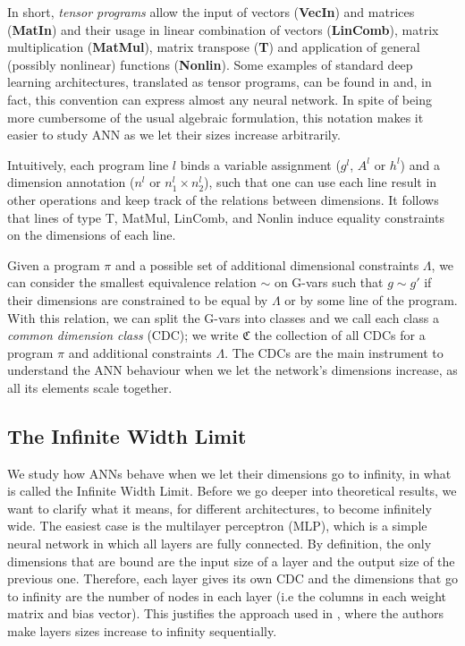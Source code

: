 \documentclass[11pt,notitlepage]{article}
\numberwithin{equation}{section}
\theoremstyle{remark}
\theoremstyle{definition}
\begin{document}
	In short, \emph{tensor programs} allow the input of vectors (\textbf{VecIn}) and matrices (\textbf{MatIn}) and their usage in linear combination of vectors (\textbf{LinComb}), matrix multiplication (\textbf{MatMul}), matrix transpose (\textbf{T}) and application of general (possibly nonlinear) functions (\textbf{Nonlin}).
	Some examples of standard deep learning architectures, translated as tensor programs, can be found in \cite[Section 3]{yang2019scaling} and, in fact, this convention can express almost any neural network.
	In spite of being more cumbersome of the usual algebraic formulation, this notation makes it easier to study ANN as we let their sizes increase arbitrarily.
	
	Intuitively, each program line $l$ binds a variable assignment ($g^l$, $A^l$ or $h^l$) and a dimension annotation ($n^l$ or $n^l_1 \times n^l_2$), such that one can use each line result in other operations and keep track of the relations between dimensions.
	It follows that lines of type T, MatMul, LinComb, and Nonlin induce equality constraints on the dimensions of each line.
	
	Given a program $\pi$ and a possible set of additional dimensional constraints $\Lambda$, we can consider the smallest equivalence relation $\sim$ on G-vars such that $g \sim g'$ if their dimensions are constrained to be equal by $\Lambda$ or by some line of the program.
	With this relation, we can split the G-vars into classes and we call each class a \emph{common dimension class} (CDC); we write $\mathfrak{C}$ the collection of all CDCs for a program $\pi$ and additional constraints $\Lambda$.
	The CDCs are the main instrument to understand the ANN behaviour when we let the network's dimensions increase, as all its elements scale together.
	
	\subsection{The Infinite Width Limit}\label{subsec:iwl}
	
	We study how ANNs behave when we let their dimensions go to infinity, in what is called the Infinite Width Limit.
	Before we go deeper into theoretical results, we want to clarify what it means, for different architectures, to become infinitely wide.
	The easiest case is the multilayer perceptron (MLP), which is a simple neural network in which all layers are fully connected.
	By definition, the only dimensions that are bound are the input size of a layer and the output size of the previous one.
	Therefore, each layer gives its own CDC and the dimensions that go to infinity are the number of nodes in each layer (i.e the columns in each weight matrix and bias vector).
	This justifies the approach used in \cite{jacot2018neural}, where the authors make layers sizes increase to infinity sequentially.
	
\end{document}
